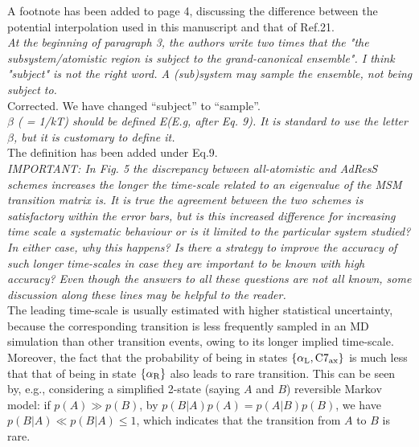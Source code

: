 \documentclass{article}
\newcommand{\confa}[0]{{\alpha_{\footnotesize\textrm{R}}}}
\newcommand{\confc}[0]{{\alpha_{\footnotesize\textrm{L}}}}
\newcommand{\confd}[0]{{\textrm{C}7_{\textrm{ax}}}}
\begin{document}
\noindent
A footnote has been added to page 4, discussing the difference between the potential interpolation
used in this manuscript and that of Ref.21.\\

\noindent
\textit{At the beginning of paragraph 3, the authors write two times that the
"the subsystem/atomistic region is subject to the grand-canonical
ensemble". I think "subject" is not the right word. A (sub)system may
sample the ensemble, not being subject to.
}\\

\noindent
Corrected. We have changed ``subject'' to ``sample''.\\

\noindent
\textit{$\beta$ ( = 1/kT) should be defined E(E.g, after Eq. 9). It is standard
to use the letter $\beta$, but it is customary to define it.}\\

\noindent
The definition has been added under Eq.9.\\

\noindent
\textit{IMPORTANT: In Fig. 5 the discrepancy between all-atomistic and AdResS
schemes increases the longer the time-scale related to an eigenvalue of
the MSM transition matrix is. It is true the agreement between the two
schemes is satisfactory within the error bars, but is this increased
difference for increasing time scale a systematic behaviour or is it
limited to the particular system studied? In either case, why this
happens? Is there a strategy to improve the accuracy of such longer
time-scales in case they are important to be known with high accuracy?
Even though the answers to all these questions are not all known, some
discussion along these lines may be helpful to the reader.}\\

\noindent
The leading time-scale is usually estimated with higher statistical
uncertainty, because the corresponding transition is less frequently
sampled in an MD simulation than other transition events, owing to its longer implied time-scale.
Moreover, the fact that the probability of being in states $\{\confc,\confd\}$ is
much less that that of being in state $\{\confa \}$ also leads to rare transition.
This can be seen by,
e.g., considering a simplified 2-state (saying $A$ and $B$) reversible Markov model:
if $p(A) \gg p(B)$, by $ p(B\vert A) p(A) = p(A\vert B) p(B) $, we have $p(B\vert A) \ll p(B\vert A) \leq 1$, which indicates that the 
transition from $A$ to $B$ is rare.\\
\end{document}
